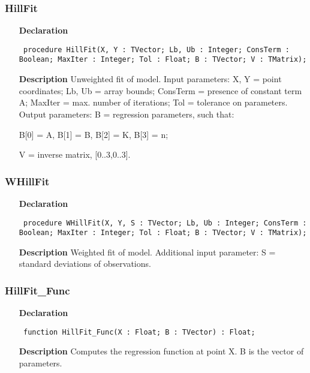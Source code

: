 \documentclass[12pt,a4paper,oneside]{report}
\newcommand{\declarationitem}[1]{\textbf{#1}}
\newcommand{\descriptiontitle}[1]{\textbf{#1}}
\newcommand{\code}[1]{\texttt{#1}}
\begin{document}
\subsubsection{HillFit}
\label{uhillfit-HillFit}
\begin{itemize}\item[\declarationitem{Declaration}\hfill]
	\begin{flushleft}
		\code{
			procedure HillFit(X, Y : TVector; Lb, Ub : Integer; ConsTerm : Boolean; MaxIter : Integer; Tol : Float; B : TVector; V : TMatrix);}
		
	\end{flushleft}
	
	\par
	\item[\descriptiontitle{Description}]
	Unweighted fit of model. Input parameters: X, Y = point coordinates; Lb, Ub = array bounds; ConsTerm = presence of constant term A; MaxIter = max. number of iterations; Tol = tolerance on parameters. Output parameters: B = regression parameters, such that:
	
	B[0] = A, B[1] = B, B[2] = K, B[3] = n; 
	
	V = inverse matrix, [0..3,0..3].
	
\end{itemize}
\subsubsection{WHillFit}
\label{uhillfit-WHillFit}
\begin{itemize}\item[\declarationitem{Declaration}\hfill]
	\begin{flushleft}
		\code{
			procedure WHillFit(X, Y, S : TVector; Lb, Ub : Integer; ConsTerm : Boolean; MaxIter : Integer; Tol : Float; B : TVector; V : TMatrix);}
		
	\end{flushleft}
	
	\par
	\item[\descriptiontitle{Description}]
	Weighted fit of model. Additional input parameter: S = standard deviations of observations.
	
\end{itemize}
\subsubsection{HillFit{\_}Func}
\label{uhillfit-HillFit_Func}
\begin{itemize}\item[\declarationitem{Declaration}\hfill]
	\begin{flushleft}
		\code{
			function HillFit{\_}Func(X : Float; B : TVector) : Float;}
		
	\end{flushleft}
	
	\par
	\item[\descriptiontitle{Description}]
	Computes the regression function at point X. B is the vector of parameters.
	
\end{itemize}
\end{document}
